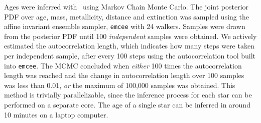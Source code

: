 Ages were inferred with \sd\ using Markov Chain Monte Carlo.
The joint posterior PDF over age, mass, metallicity, distance and extinction
was sampled using the affine invariant ensemble sampler, {\tt emcee}
\citep{foreman-mackey2013} with 24 walkers.
Samples were drawn from the posterior PDF until 100 {\it independent} samples
were obtained.
We actively estimated the autocorrelation length, which indicates how many
steps were taken per independent sample, after every 100 steps using the
autocorrelation tool built into {\tt emcee}.
The MCMC concluded when {\it either} 100 times the autocorrelation length was
reached and the change in autocorrelation length over 100 samples was less
than 0.01, {\it or} the maximum of 100,000 samples was obtained.
This method is trivially parallelizable, since the inference process for each
star can be performed on a separate core.
The age of a single star can be inferred in around 10 minutes on a laptop
computer.


